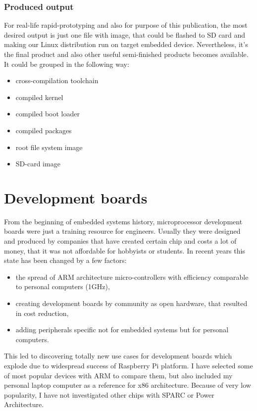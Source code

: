 \documentclass[printmode]{mgr}
\begin{document}
\subsection*{Produced output}

For real-life rapid-prototyping and also for purpose of this publication, the most desired output is just one file with image, that could be flashed to SD card and making our Linux distribution run on target embedded device. Nevertheless, it's the final product and also other useful semi-finished products becomes available. It could be grouped in the following way:

\begin{itemize}
    \item cross-compilation toolchain
    \item compiled kernel
    \item compiled boot loader
    \item compiled packages
    \item root file system image
    \item SD-card image
\end{itemize}



















\chapter{Development boards}
\label{section:development-boards}

From the beginning of embedded systems history, microprocessor development boards were just a training resource for engineers.
Usually they were designed and produced by companies that have created certain chip and costs a lot of money, that it was not affordable for hobbyists or students.
In recent years this state has been changed by a few factors:
\begin{itemize}
  \item the spread of ARM architecture micro-controllers with efficiency comparable to personal computers (1GHz),
  \item creating development boards by community as open hardware, that resulted in cost reduction,
  \item adding peripherals specific not for embedded systems but for personal computers.
\end{itemize}
This led to discovering totally new use cases for development boards which explode due to widespread success of Raspberry Pi platform.
I have selected some of most popular devices with ARM to compare them, but also included my personal laptop computer as a reference for x86 architecture. Because of very low popularity, I  have not investigated other chips with SPARC or Power Architecture.
\end{document}
